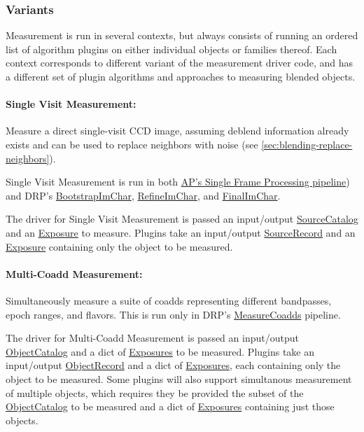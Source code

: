 \subsubsection{Variants}
Measurement is run in several contexts, but always consists of running an ordered list of algorithm plugins on either individual objects or families thereof.  Each context corresponds to different variant of the measurement driver code, and has a different set of plugin algorithms and approaches to measuring blended objects.

\paragraph{Single Visit Measurement:} Measure a direct single-visit CCD image, assuming deblend information already exists and can be used to replace neighbors with noise (see \ref{sec:blending-replace-neighbors}).

Single Visit Measurement is run in both \hyperref[sec:apSingleFrameProcessing]{AP's Single Frame Processing pipeline}) and DRP's \hyperref[sec:drpBootstrapImChar]{BootstrapImChar}, \hyperref[sec:drpRefineImChar]{RefineImChar}, and \hyperref[sec:drpFinalImChar]{FinalImChar}.

The driver for Single Visit Measurement is passed an input/output \hyperref[sec:spTablesSource]{SourceCatalog} and an \hyperref[sec:spImagesExposure]{Exposure} to measure.  Plugins take an input/output \hyperref[sec:spTablesSource]{SourceRecord} and an \hyperref[sec:spImagesExposure]{Exposure} containing only the object to be measured.

\paragraph{Multi-Coadd Measurement:} Simultaneously measure a suite of coadds representing different bandpasses, epoch ranges, and flavors.  This is run only in DRP's \hyperref[sec:drpMeasureCoadds]{MeasureCoadds} pipeline.

The driver for Multi-Coadd Measurement is passed an input/output \hyperref[sec:spTablesObject]{ObjectCatalog} and a dict of \hyperref[sec:spImagesExposure]{Exposures} to be measured.  Plugins take an input/output \hyperref[sec:spTablesObject]{ObjectRecord} and a dict of \hyperref[sec:spImagesExposure]{Exposures}, each containing only the object to be measured.  Some plugins will also support simultanous measurement of multiple objects, which requires they be provided the subset of the \hyperref[sec:spTablesObject]{ObjectCatalog} to be measured and a dict of \hyperref[sec:spImagesExposure]{Exposures} containing just those objects.

